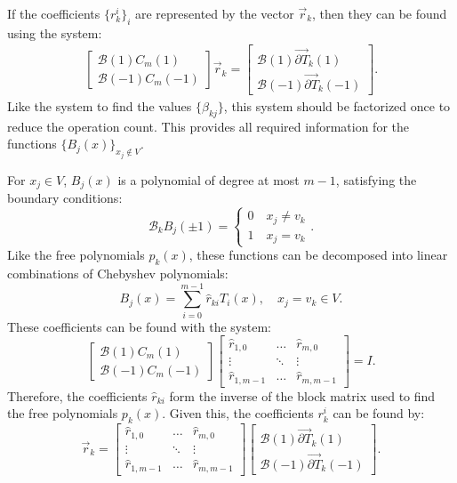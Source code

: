\documentclass{sfuthesis}
\begin{document}
If the coefficients $\{ r_{k}^i \}_i$ are represented by the vector $\vec{r}_{k}$, then they can be found using the system:
\begin{equation}
\begin{gathered}
\begin{bmatrix}\mathcal{B}(1) C_m(1) \\ \mathcal{B}(-1) C_m(-1) \end{bmatrix}
\vec{r}_{k} = 
\begin{bmatrix} \mathcal{B}(1) \vec{\partial T}_k(1) \\ \mathcal{B}(-1) \vec{\partial T}_k(-1) \end{bmatrix} .
\end{gathered}
\end{equation}
Like the system to find the values $\{ \beta_{kj} \}$, this system should be factorized once to reduce the operation count.
This provides all required information for the functions $\{ B_j(x) \}_{x_j \notin V}$.

For $x_j \in V$, $B_j(x)$ is a polynomial of degree at most $m-1$, satisfying the boundary conditions: 
\begin{equation}
\mathcal{B}_k B_j(\pm 1) = \begin{cases} 0 \quad x_j \neq v_k \\ 1 \quad x_j = v_k \end{cases} .
\end{equation}
Like the free polynomials $p_k(x)$, these functions can be decomposed into linear combinations of Chebyshev polynomials:
\begin{equation}
B_j(x) = \sum_{i=0}^{m-1} \hat{r}_{ki} T_i(x), \quad x_j = v_k \in V .
\end{equation}
These coefficients can be found with the system:
\begin{equation}
\begin{bmatrix} \mathcal{B}(1) C_m(1) \\ \mathcal{B}(-1) C_m(-1) \end{bmatrix}
\begin{bmatrix}\hat{r}_{1,0} & \dots & \hat{r}_{m,0} \\ \vdots & \ddots & \vdots \\ \hat{r}_{1,m-1} & \dots & \hat{r}_{m,m-1} \end{bmatrix} = I .
\end{equation}
Therefore, the coefficients $\hat{r}_{ki}$ form the inverse of the block matrix used to find the free polynomials $p_k(x)$.
Given this, the coefficients $r_k^i$ can be found by:
\begin{equation}
\vec{r}_k = 
\begin{bmatrix}\hat{r}_{1,0} & \dots & \hat{r}_{m,0} \\ \vdots & \ddots & \vdots \\ \hat{r}_{1,m-1} & \dots & \hat{r}_{m,m-1} \end{bmatrix} 
\begin{bmatrix} \mathcal{B}(1) \vec{\partial T}_k(1) \\ \mathcal{B}(-1) \vec{\partial T}_k(-1) \end{bmatrix} .
\end{equation}
\end{document}
